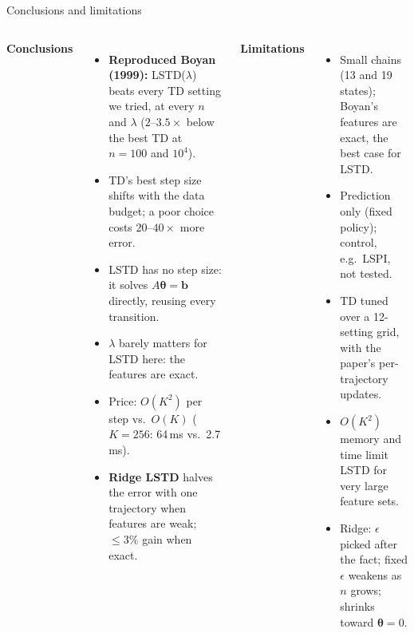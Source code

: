 \documentclass[aspectratio=169,11pt]{beamer}
\newcommand{\memberD}{Member D}
\newcommand{\darkbg}{\fill[ink] (current page.south west) rectangle (current page.north east);}
\newcommand{\speaker}[1]{} %
\newcommand{\hl}[1]{\textcolor{accent}{\textbf{#1}}}
\newcommand{\vth}{\bm{\theta}}
\begin{document}
\begin{frame}{Conclusions and limitations}
  \speaker{\memberD}
  \footnotesize
  \begin{columns}[T]
    \textbf{Conclusions}
    \begin{itemize}
      \item \hl{Reproduced Boyan (1999):} LSTD($\lambda$) beats every TD setting we tried, at every $n$ and $\lambda$ ($2$--$3.5\times$ below the best TD at $n=100$ and $10^4$).
      \item TD's best step size shifts with the data budget; a poor choice costs $20$--$40\times$ more error.
      \item LSTD has no step size: it solves $A\vth=\mathbf{b}$ directly, reusing every transition.
      \item $\lambda$ barely matters for LSTD here: the features are exact.
      \item Price: $O(K^2)$ per step vs.\ $O(K)$ ($K=256$: 64\,ms vs.\ 2.7\,ms).
      \item \hl{Ridge LSTD} halves the error with one trajectory when features are weak; $\le 3\%$ gain when exact.
    \end{itemize}
    \textbf{Limitations}
    \begin{itemize}
      \item Small chains (13 and 19 states); Boyan's features are exact, the best case for LSTD.
      \item Prediction only (fixed policy); control, e.g.\ LSPI, not tested.
      \item TD tuned over a 12-setting grid, with the paper's per-trajectory updates.
      \item $O(K^2)$ memory and time limit LSTD for very large feature sets.
      \item Ridge: $\epsilon$ picked after the fact; fixed $\epsilon$ weakens as $n$ grows; shrinks toward $\vth=0$.
    \end{itemize}
  \end{columns}
\end{frame}

\begin{frame}[plain]
\end{frame}

\end{document}
